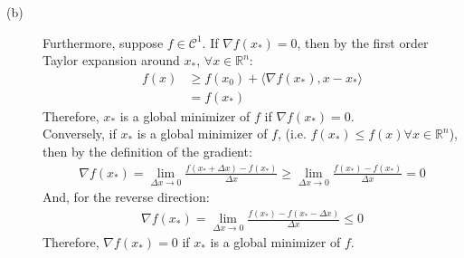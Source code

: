 \documentclass[11pt]{article}
\begin{document}
\begin{description}
\begin{description}
    \item[(b)]
    Furthermore, suppose $f\in\mathcal{C}^1$. If $\nabla f(x_*) = 0$, then by the first order
    Taylor expansion around $x_*$, $\forall x \in \mathbb{R}^n$:
    \begin{equation*}
        \begin{aligned}
            f(x) &\geq f(x_0) + \langle  \nabla f(x_*), x-x_* \rangle \\
            &= f(x_*)
        \end{aligned}
    \end{equation*}
    Therefore, $x_*$ is a global minimizer of $f$ if $\nabla f(x_*) = 0$. \\
    Conversely, if $x_*$ is a global minimizer of $f$, (i.e. $f(x_*) \leq f(x) \forall x \in \mathbb{R}^n$), then by the definition of the gradient:
    \begin{equation*}
        \begin{aligned}
            \nabla f(x_*) = \lim_{\Delta x \rightarrow 0} \frac{f(x_* + \Delta x) - f(x_*)}{\Delta x} \geq \lim_{\Delta x \rightarrow 0} \frac{f(x_*) - f(x_*)}{\Delta x} = 0
        \end{aligned}
    \end{equation*}
    And, for the reverse direction:
    \begin{equation*}
        \begin{aligned}
            \nabla f(x_*) = \lim_{\Delta x \rightarrow 0} \frac{f(x_*) - f(x_* - \Delta x)}{\Delta x} \leq 0
        \end{aligned}
    \end{equation*}
    Therefore, $\nabla f(x_*) = 0$ if $x_*$ is a global minimizer of $f$.


\end{description}


\end{description}
\end{document}
